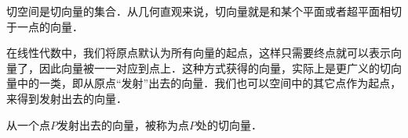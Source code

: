 

切空间是切向量的集合．从几何直观来说，切向量就是和某个平面或者超平面相切于一点的向量．

在线性代数中，我们将原点默认为所有向量的起点，这样只需要终点就可以表示向量了，因此向量被一一对应到点上．这种方式获得的向量，实际上是更广义的切向量中的一类，即从原点“发射”出去的向量．我们也可以空间中的其它点作为起点，来得到发射出去的向量．

从一个点$P$发射出去的向量，被称为点$P$处的切向量．


